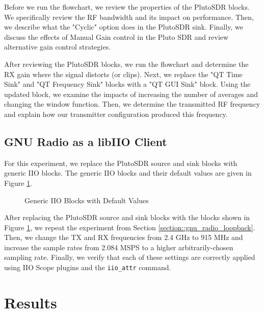 \documentclass{article}
\begin{document}
Before we run the flowchart, we review the properties of the PlutoSDR blocks. We specifically review the RF bandwidth and its impact on performance. Then, we describe what the "Cyclic" option does in the PlutoSDR sink. Finally, we discuss the effects of Manual Gain control in the Pluto SDR and review alternative gain control strategies.

After reviewing the PlutoSDR blocks, we run the flowchart and determine the RX gain where the signal distorts (or clips). Next, we replace the "QT Time Sink" and "QT Frequency Sink" blocks with a "QT GUI Sink" block. Using the updated block, we examine the impacts of increasing the number of averages and changing the window function. Then, we determine the transmitted RF frequency and explain how our transmitter configuration produced this frequency.

\subsection{GNU Radio as a libIIO Client}

For this experiment, we replace the PlutoSDR source and sink blocks with generic IIO blocks. The generic IIO blocks and their default values are given in Figure \ref{fig::generic_iio_blocks}.

\begin{figure}[H]
	\centerline{}
	\caption{Generic IIO Blocks with Default Values}
	\label{fig::generic_iio_blocks}
\end{figure}

After replacing the PlutoSDR source and sink blocks with the blocks shown in Figure \ref{fig::generic_iio_blocks}, we repeat the experiment from Section \ref{section::gnu_radio_loopback}. Then, we change the TX and RX frequencies from 2.4 GHz to 915 MHz and increase the sample rates from 2.084 MSPS to a higher arbitrarily-chosen sampling rate. Finally, we verify that each of these settings are correctly applied using IIO Scope plugins and the \texttt{iio\_attr} command. 
 
\section{Results}
\end{document}
